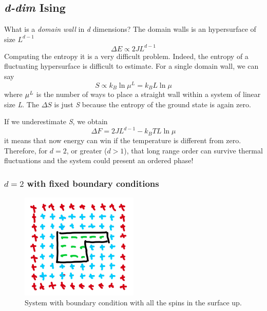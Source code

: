 \documentclass[../../Main/Main.tex]{subfiles}
\begin{document}
\subsection{\emph{d-dim} Ising}
What is a \emph{domain wall} in \emph{d} dimensions? The domain walls is an hypersurface of size \( L^{d-1} \)
\begin{equation}
  \Delta E \propto 2JL^{d-1}
\end{equation}
Computing the entropy it is a very difficult problem. Indeed, the entropy of a fluctuating hypersurface is difficult to estimate. 
For a single domain wall, we can say
\begin{equation}
  S \propto k_B \ln{\mu^L} = k_B L \ln{\mu}
\end{equation}
where  \( \mu^{\emph{L}} \) is the number of ways to place a straight wall within a system of linear size \emph{L}.
The \( \Delta S \)  is just \emph{S}  because the entropy of the ground state is again zero.
\begin{remark}
If we underestimate \emph{S}, we obtain
\begin{equation}
  \Delta F = 2JL^{d-1}-k_B T L \ln{\mu}
\end{equation}
it means that now energy can win if the temperature is different from zero. Therefore, for \( d=2 \),  or greater (\( d>1 \)), that long range order can survive  thermal fluctuations and the system could present an ordered phase!
\end{remark}

\subsubsection{$d = 2$ with fixed boundary conditions}

\begin{figure}[H]
\centering
\includegraphics[width=0.5\textwidth]{./img/IMG1.png}
\caption{\label{fig:10_1} System with boundary condition with all the spins in the surface up.}
\end{figure}
\end{document}
